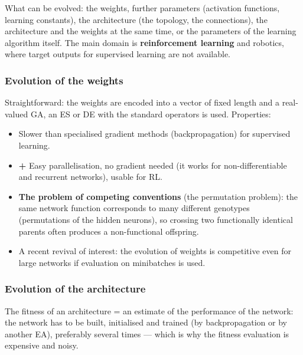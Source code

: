 \documentclass[11pt,a4paper]{article}
\theoremstyle{definition}
\begin{document}
What can be evolved: the weights, further parameters (activation functions,
learning constants), the architecture (the topology, the connections), the
architecture and the weights at the same time, or the parameters of the learning
algorithm itself. The main domain is \textbf{reinforcement learning} and
robotics, where target outputs for supervised learning are not available.

\subsubsection{Evolution of the weights}

Straightforward: the weights are encoded into a vector of fixed length and a
real-valued GA, an ES or DE with the standard operators is used. Properties:
\begin{itemize}
\item Slower than specialised gradient methods (backpropagation) for supervised
  learning.
\item \textbf{+} Easy parallelisation, no gradient needed (it works for
  non-differentiable and recurrent networks), usable for RL.
\item \textbf{The problem of competing conventions} (the permutation problem):
  the same network function corresponds to many different genotypes
  (permutations of the hidden neurons), so crossing two functionally identical
  parents often produces a non-functional offspring.
\item A recent revival of interest: the evolution of weights is competitive even
  for large networks if evaluation on minibatches is used.
\end{itemize}

\subsubsection{Evolution of the architecture}

The fitness of an architecture = an estimate of the performance of the network:
the network has to be built, initialised and trained (by backpropagation or by
another EA), preferably several times --- which is why the fitness evaluation is
expensive and noisy.
\end{document}
